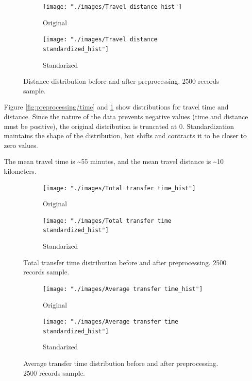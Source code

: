 \documentclass{article}
\begin{document}
\begin{figure}[H]
  \centering
  \begin{subfigure}[b]{.45\textwidth}
  	\centering
  	\texttt{[image: "./images/Travel distance\_hist"]}
  	\caption{Original}
  \end{subfigure}
  \begin{subfigure}[b]{.45\textwidth}
  	\centering
  	\texttt{[image: "./images/Travel distance standardized\_hist"]}
  	\caption{Standarized}
  \end{subfigure}
  \caption{Distance distribution before and after preprocessing. 2500 records sample.}
  	\label{fig:preprocessing/distance}
\end{figure}

Figure \ref{fig:preprocessing/time} and \ref{fig:preprocessing/distance} show distributions for travel time and distance. Since the nature of the data prevents negative values (time and distance must be positive), the original distribution is truncated at 0. Standardization maintains the shape of the distribution, but shifts and contracts it to be closer to zero values.

The mean travel time is \textasciitilde 55 minutes, and the mean travel distance is \textasciitilde 10 kilometers.  
 
\begin{figure}[H]
  \centering
  \begin{subfigure}[b]{.45\textwidth}
  	\centering
  	\texttt{[image: "./images/Total transfer time\_hist"]}
  	\caption{Original}
  \end{subfigure}
  \begin{subfigure}[b]{.45\textwidth}
  	\centering
  	\texttt{[image: "./images/Total transfer time standardized\_hist"]}
  	\caption{Standarized}
  \end{subfigure}
  \caption{Total transfer time distribution before and after preprocessing. 2500 records sample.}
  	\label{fig:preprocessing/transfer_time}
\end{figure}

\begin{figure}[H]
  \centering
  \begin{subfigure}[b]{.45\textwidth}
  	\centering
  	\texttt{[image: "./images/Average transfer time\_hist"]}
  	\caption{Original}
  \end{subfigure}
  \begin{subfigure}[b]{.45\textwidth}
  	\centering
  	\texttt{[image: "./images/Average transfer time standardized\_hist"]}
  	\caption{Standarized}
  \end{subfigure}
  \caption{Average transfer time distribution before and after preprocessing. 2500 records sample.}
  	\label{fig:preprocessing/transfer_avg}
\end{figure}
\end{document}
